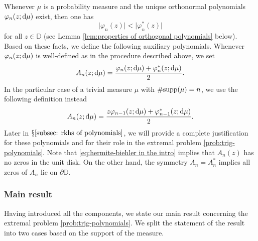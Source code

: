 \documentclass[reqno, a4paper]{amsart}
\def\supp{{\rm supp}}
\renewcommand{\d}{\text{\rm d}}
\newcommand{\dD}{\partial\mathbb{D}}
\theoremstyle{plain}
\theoremstyle{definition}
\theoremstyle{remarkstyle}
\numberwithin{equation}{section}
\begin{document}
\smallskip

Whenever $\mu$ is a probability measure and the unique orthonormal polynomials $\varphi_n(z; \d\mu)$ exist, then one has 
\begin{equation}\label{eq:hermite-biehler in the intro}
    \lvert\varphi_n(z)\rvert < \lvert \varphi_n^*(z)\rvert
\end{equation}
for all $z\in \mathbb{D}$ (see Lemma \ref{lem:properties of orthogonal polynomials} below). Based on these facts, we define the following auxiliary polynomials. Whenever $\varphi_n(z; \d\mu)$ is well-defined as in the procedure described above, we set 
\begin{equation*}
    A_{n}(z;\d\mu)=\frac{\varphi_n(z;\d\mu)+\varphi_n^*(z;\d\mu)}{2}.
\end{equation*}
In the particular case of a trivial measure $\mu$ with $\#\supp(\mu)=n$, we use the following definition instead 
\begin{equation*}
    A_n(z;\d\mu)=\frac{z \varphi_{n-1}(z;\d\mu)+\varphi_{n-1}^\ast(z;\d\mu)}{2}.
\end{equation*}
Later in $\mathsection \ref{subsec: rkhs of polynomials}$, we will provide a complete justification for these polynomials and for their role in the extremal problem \ref{prob:trig-polynomials}. Note that \eqref{eq:hermite-biehler in the intro} implies that $A_n(z)$ has no zeros in the unit disk. On the other hand, the symmetry $A_n=A^*_n$ implies all zeros of $A_n$ lie on $\dD$.


\subsubsection{Main result}
Having introduced all the components, we state our main result concerning the extremal problem \ref{prob:trig-polynomials}. We split the statement of the result into two cases based on the support of the measure.
\end{document}
